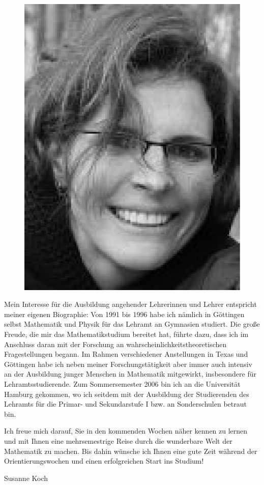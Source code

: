 \begin{figure}
\includegraphics[scale=0.15]{images/koch}
\end{figure}

Mein Interesse für die Ausbildung angehender Lehrerinnen und Lehrer entspricht
meiner eigenen Biographie: Von 1991 bis 1996 habe ich nämlich in Göttingen
selbst Mathematik und Physik für das Lehramt an Gymnasien studiert. Die große
Freude, die mir das Mathematikstudium bereitet hat, führte dazu, dass ich im
Anschluss daran mit der Forschung an wahrscheinlichkeitstheoretischen
Fragestellungen begann. Im Rahmen verschiedener Anstellungen in Texas und
Göttingen habe ich neben meiner Forschungstätigkeit aber immer auch intensiv an
der Ausbildung junger Menschen in Mathematik mitgewirkt, insbesondere für
Lehramtsstudierende. Zum Sommersemester 2006 bin ich an die Universität Hamburg
gekommen, wo ich seitdem mit der Ausbildung der Studierenden des Lehramts für
die Primar- und Sekundarstufe I bzw. an Sonderschulen betraut bin.

Ich freue mich darauf, Sie in den kommenden Wochen näher kennen zu lernen und
mit Ihnen eine mehrsemestrige Reise durch die wunderbare Welt der Mathematik zu
machen. Bis dahin wünsche ich Ihnen eine gute Zeit während der
Orientierungswochen und einen erfolgreichen Start ins Studium!

\hfill Susanne Koch
